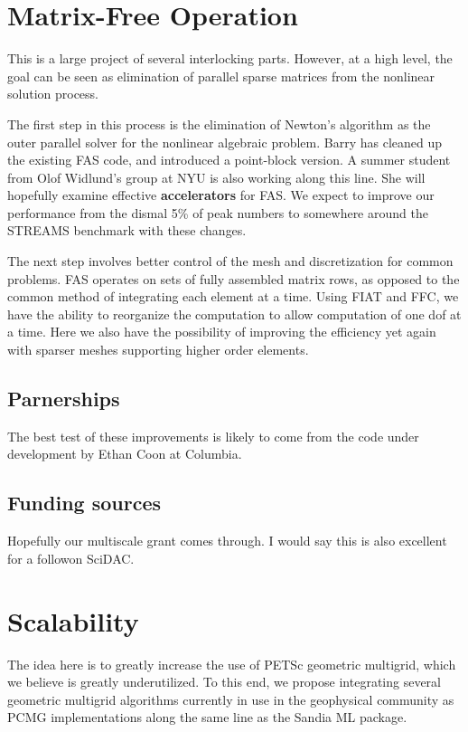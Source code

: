 \section{Matrix-Free Operation}

	This is a large project of several interlocking parts. However, at a high level, the goal can be seen as
elimination of parallel sparse matrices from the nonlinear solution process.

	The first step in this process is the elimination of Newton's algorithm as the outer parallel solver for the
nonlinear algebraic problem. Barry has cleaned up the existing FAS code, and introduced a point-block version. A summer
student from Olof Widlund's group at NYU is also working along this line. She will hopefully examine effective
{\bf accelerators}  for FAS. We expect to improve our performance from the dismal 5\% of peak numbers to somewhere around
the STREAMS benchmark with these changes.

	The next step involves better control of the mesh and discretization for common problems. FAS operates on sets
of fully assembled matrix rows, as opposed to the common method of integrating each element at a time. Using FIAT and
FFC, we have the ability to reorganize the computation to allow computation of one dof at a time. Here we also have the
possibility of improving the efficiency yet again with sparser meshes supporting higher order elements.

  \subsection{Parnerships}

	The best test of these improvements is likely to come from the code under development by Ethan Coon at Columbia.

  \subsection{Funding sources}

	Hopefully our multiscale grant comes through. I would say this is also excellent for a followon SciDAC.

\section{Scalability}

	The idea here is to greatly increase the use of PETSc geometric multigrid, which we believe is greatly
underutilized. To this end, we propose integrating several geometric multigrid algorithms currently in use in the
geophysical community as PCMG implementations along the same line as the Sandia ML package.


